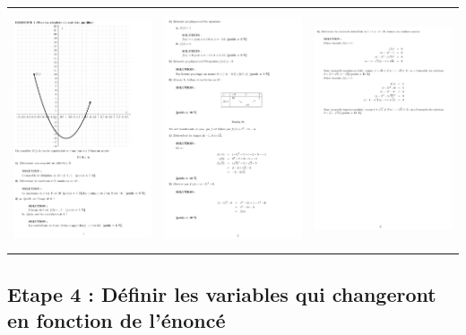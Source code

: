 { \begin{center}
 \begin{tabular}{ccc}
 \includegraphics[width=5cm,height=7cm]{./images/creation_exercice_11.png}
&
 \includegraphics[width=5cm,height=7cm]{./images/creation_exercice_12.png}
 &
 \includegraphics[width=5cm,height=7cm]{./images/creation_exercice_13.png}
\end{tabular}
\end{center}

\subsection{Etape 4 : Définir les variables qui changeront en fonction de l'énoncé}

}
